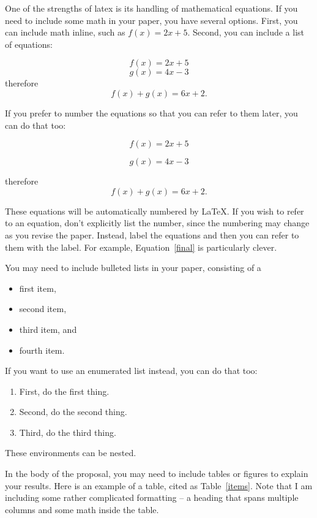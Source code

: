 \documentclass[11pt,onecolumn]{IEEEtran}
\begin{document}
One of the strengths of latex is its handling of mathematical equations.
If you need to include some math in your paper, you have several options.
First, you can include math inline, such as $f(x) = 2x + 5$.  Second,
you can include a list of equations:

\[ f(x) = 2x + 5 \]
\[ g(x) = 4x - 3 \]
therefore
\[ f(x) + g(x) = 6x + 2. \]

If you prefer to number the equations so that you can refer to them
later, you can do that too:

\begin{equation}
f(x) = 2x + 5
\end{equation}

\begin{equation}
g(x) = 4x - 3
\end{equation}

therefore
\begin{equation}
f(x) + g(x) = 6x + 2.
\label{final}
\end{equation}

These equations will be automatically numbered by LaTeX.  If you wish
to refer to an equation, don't explicitly list the number, since the
numbering may change as you revise the paper.  Instead, label the
equations and then you can refer to them with the label.  For example,
Equation~\ref{final} is particularly clever.

You may need to include bulleted lists in your paper, consisting of a
\begin{itemize}
\item first item,
\item second item,
\item third item, and
\item fourth item.
\end{itemize}
If you want to use an enumerated list instead, you can do that too:
\begin{enumerate}
\item First, do the first thing.
\item Second, do the second thing.
\item Third, do the third thing.
\end{enumerate}
These environments can be nested.

In the body of the proposal, you may need to include tables or figures
to explain your results.  Here is an example of a table, cited as
Table~\ref{items}.  Note that I am including some rather complicated
formatting -- a heading that spans multiple columns and some math
inside the table.
\end{document}
